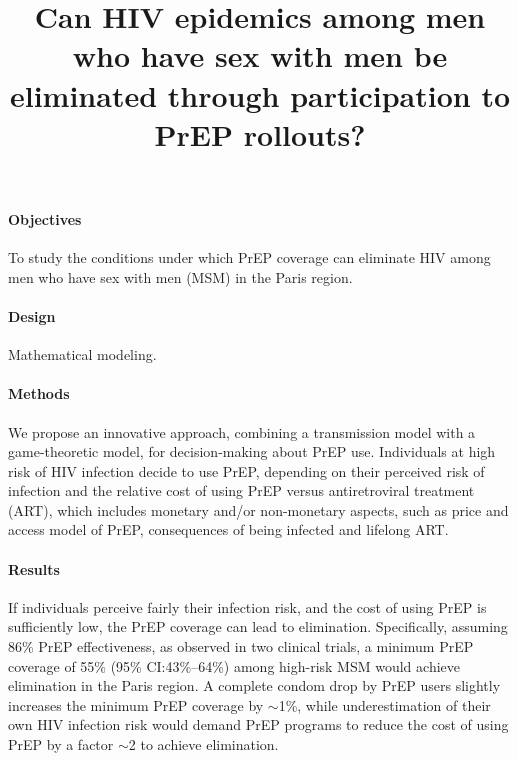 \documentclass[preprint,review,12pt]{article}			%
\begin{document}

\title{Can HIV epidemics among men who have sex with men be eliminated through participation to PrEP rollouts?}
 
%
%
%
%
%





\paragraph{Objectives}
To study the conditions under which PrEP coverage can eliminate HIV among men who have sex with men (MSM) in the Paris region. 

\paragraph{Design} 
Mathematical modeling.

\paragraph{Methods}
We propose an innovative approach, combining a transmission model with a game-theoretic model, for decision-making about PrEP use. Individuals at high risk of HIV infection decide to use PrEP, depending on their perceived risk of infection and the relative cost of using PrEP versus antiretroviral treatment (ART), which includes monetary and/or non-monetary aspects, such as price and access model of PrEP, consequences of being infected and lifelong ART. 

\paragraph{Results}
If individuals perceive fairly their infection risk, and the cost of using PrEP is sufficiently low, the PrEP coverage can lead to elimination. Specifically, assuming 86\% PrEP effectiveness, as observed in two clinical trials, a minimum PrEP coverage of 55\% (95\% CI:43\%--64\%) among high-risk MSM would achieve elimination in the Paris region. A complete condom drop by PrEP users slightly increases the minimum PrEP coverage by $\sim$1\%, while underestimation of their own HIV infection risk would demand PrEP programs to reduce the cost of using PrEP by a factor $\sim$2 to achieve elimination. 
 
\end{document}
